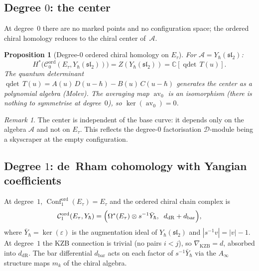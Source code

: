 \documentclass[11pt,reqno]{amsart}
\newtheorem{proposition}[theorem]{Proposition}
\theoremstyle{definition}
\theoremstyle{remark}
\newtheorem{remark}[theorem]{Remark}
\newcommand{\cA}{\mathcal{A}}
\newcommand{\cC}{\mathcal{C}}
\newcommand{\cD}{\mathcal{D}}
\newcommand{\Ainf}{A_{\infty}}
\DeclareMathOperator{\Conf}{Conf}
\DeclareMathOperator{\av}{av}
\newcommand{\CC}{\mathbb{C}}
\numberwithin{equation}{section}
\begin{document}
\subsection{Degree $0$: the center}
\label{subsec:ell-degree0}

At degree~$0$ there are no marked points and no
configuration space; the ordered chiral homology reduces
to the chiral center of~$\cA$.

\begin{proposition}[Degree-$0$ ordered chiral homology on
$E_\tau$]
\label{prop:ell-degree0}
For $\cA = Y_\hbar(\mathfrak{sl}_2)$:
\begin{equation}\label{eq:ell-degree0}
  H^*\bigl(\cC_0^{\mathrm{ord}}(E_\tau,
  Y_\hbar(\mathfrak{sl}_2))\bigr)
  = Z(Y_\hbar(\mathfrak{sl}_2))
  = \CC[\operatorname{qdet}\,T(u)].
\end{equation}
The quantum determinant
$\operatorname{qdet}\,T(u) = A(u)\,D(u - \hbar)
- B(u)\,C(u - \hbar)$ generates the center as a
polynomial algebra \textup{(}Molev\textup{)}.
The averaging map $\av_0$ is an isomorphism
\textup{(}there is nothing to symmetrise at degree~$0$\textup{)},
so $\ker(\av_0) = 0$.
\end{proposition}

\begin{remark}
The center is independent of the base curve: it depends
only on the algebra $\cA$ and not on $E_\tau$. This reflects
the degree-$0$ factorisation $\cD$-module being a skyscraper at
the empty configuration.
\end{remark}

\subsection{Degree $1$: de~Rham cohomology with Yangian
coefficients}
\label{subsec:ell-degree1}

At degree~$1$,
$\Conf_1^{\mathrm{ord}}(E_\tau) = E_\tau$ and the ordered
chiral chain complex is
\begin{equation}\label{eq:ell-degree1-cx}
  \cC_1^{\mathrm{ord}}(E_\tau, Y_\hbar)
  = \Bigl(\Omega^*(E_\tau) \otimes s^{-1}\bar{Y}_\hbar,
  \;\; d_{\mathrm{dR}} + d_{\mathrm{bar}}\Bigr),
\end{equation}
where $\bar{Y}_\hbar = \ker(\varepsilon)$ is the
augmentation ideal of $Y_\hbar(\mathfrak{sl}_2)$ and
$|s^{-1}v| = |v| - 1$.
At degree~$1$ the KZB connection is trivial (no pairs
$i < j$), so $\nabla_{\mathrm{KZB}} = d$, absorbed into
$d_{\mathrm{dR}}$. The bar differential $d_{\mathrm{bar}}$
acts on each factor of $s^{-1}\bar{Y}_\hbar$ via the
$\Ainf$ structure maps $m_k$ of the chiral algebra.
\end{document}
